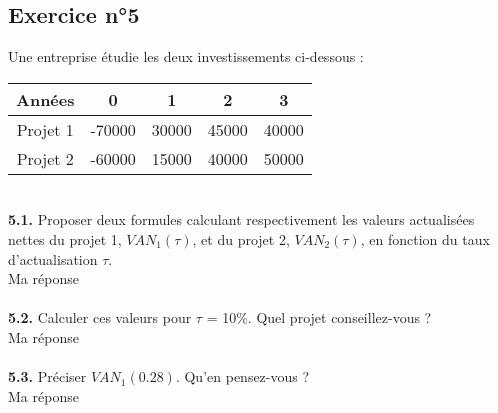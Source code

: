 \documentclass{article}
\begin{document}
\subsection{Exercice n°5}
\textcolor{exogris}{
Une entreprise étudie les deux investissements ci-dessous :
\begin{center}
\begin{tabular}{ |c|c|c|c|c| } 
 \hline
 Années & 0 & 1 & 2 & 3 \\ \hline
 Projet 1 & -70000 & 30000 & 45000 & 40000 \\ \hline
 Projet 2 & -60000 & 15000 & 40000 & 50000 \\
 \hline
\end{tabular}
\end{center}
}%
 
%
\\ \textcolor{exogris}{\textbf{5.1.}
Proposer deux formules calculant respectivement les valeurs actualisées nettes du projet 1, $VAN_1(\tau)$, et du projet 2, $VAN_2(\tau)$, en fonction du taux d’actualisation $\tau$.
}
\\%
Ma réponse
\\%
\\%
\textcolor{exogris}{\textbf{5.2.}
Calculer ces valeurs pour $\tau$ = 10\%. Quel projet conseillez-vous ?
}
\\%
Ma réponse
\\%
\\%
\textcolor{exogris}{\textbf{5.3.}
Préciser $VAN_1(0.28)$. Qu’en pensez-vous ?
}%
\\%
Ma réponse
\end{document}
